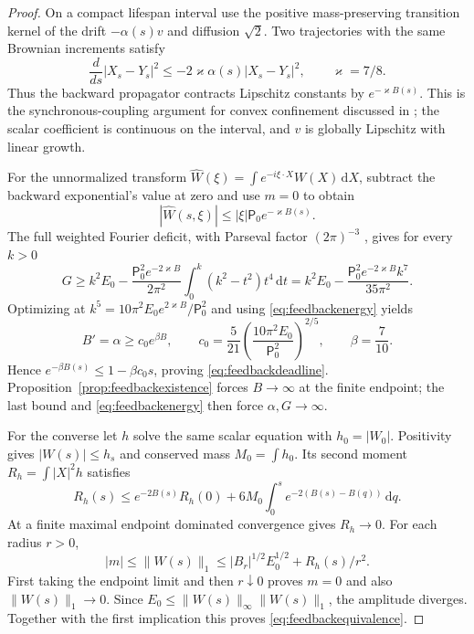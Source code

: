 \documentclass[11pt]{article}
\numberwithin{equation}{section}
\newcommand{\dd}{\,\mathrm d}
\begin{document}
\begin{proof}
On a compact lifespan interval use the positive mass-preserving
transition kernel of the drift $-\alpha(s)v$ and diffusion $\sqrt2$.
Two trajectories with the same Brownian increments satisfy
\[
 \frac{d}{ds}|X_s-Y_s|^2
  \le-2\varkappa\alpha(s)|X_s-Y_s|^2,\qquad \varkappa=7/8.
\]
Thus the backward propagator contracts Lipschitz constants by
$e^{-\varkappa B(s)}$. This is the synchronous-coupling argument for
convex confinement discussed in \cite{EberleCoupling}; the scalar
coefficient is continuous on the interval, and $v$ is globally
Lipschitz with linear growth.

For the unnormalized transform
$\widehat W(\xi)=\int e^{-i\xi\cdot X}W(X)\dd X$, subtract the
backward exponential's value at zero and use $m=0$ to obtain
\[
 |\widehat W(s,\xi)|\le |\xi|\mathsf P_0e^{-\varkappa B(s)}.
\]
The full weighted Fourier deficit, with Parseval factor
$(2\pi)^{-3}$ \cite{DLMFFourier}, gives for every $k>0$
\begin{equation}\label{eq:feedbackfouriersplit}
 G\ge k^2E_0-\frac{\mathsf P_0^2e^{-2\varkappa B}}{2\pi^2}
                \int_0^k(k^2-t^2)t^4\dd t
   =k^2E_0-\frac{\mathsf P_0^2e^{-2\varkappa B}k^7}{35\pi^2}.
\end{equation}
Optimizing at
$k^5=10\pi^2E_0e^{2\varkappa B}/\mathsf P_0^2$ and using
\eqref{eq:feedbackenergy} yields
\[
 B'=\alpha\ge c_0e^{\beta B},\qquad
 c_0=\frac5{21}\left(\frac{10\pi^2E_0}{\mathsf P_0^2}\right)^{2/5},
 \qquad \beta=\frac7{10}.
\]
Hence $e^{-\beta B(s)}\le1-\beta c_0s$, proving
\eqref{eq:feedbackdeadline}. Proposition~\ref{prop:feedbackexistence}
forces $B\to\infty$ at the finite endpoint; the last bound and
\eqref{eq:feedbackenergy} then force $\alpha,G\to\infty$.

For the converse let $h$ solve the same scalar equation with
$h_0=|W_0|$. Positivity gives $|W(s)|\le h_s$ and conserved mass
$M_0=\int h_0$. Its second moment $R_h=\int|X|^2h$ satisfies
\begin{equation}\label{eq:feedbackenvelopemoment}
 R_h(s)\le e^{-2B(s)}R_h(0)
    +6M_0\int_0^se^{-2(B(s)-B(q))}\dd q.
\end{equation}
At a finite maximal endpoint dominated convergence gives $R_h\to0$.
For each radius $r>0$,
\[
 |m|\le\|W(s)\|_1
 \le |B_r|^{1/2}E_0^{1/2}+R_h(s)/r^2.
\]
First taking the endpoint limit and then $r\downarrow0$ proves $m=0$
and also $\|W(s)\|_1\to0$. Since
$E_0\le\|W(s)\|_\infty\|W(s)\|_1$, the amplitude diverges.
Together with the first implication this proves
\eqref{eq:feedbackequivalence}.
\end{proof}
\end{document}
